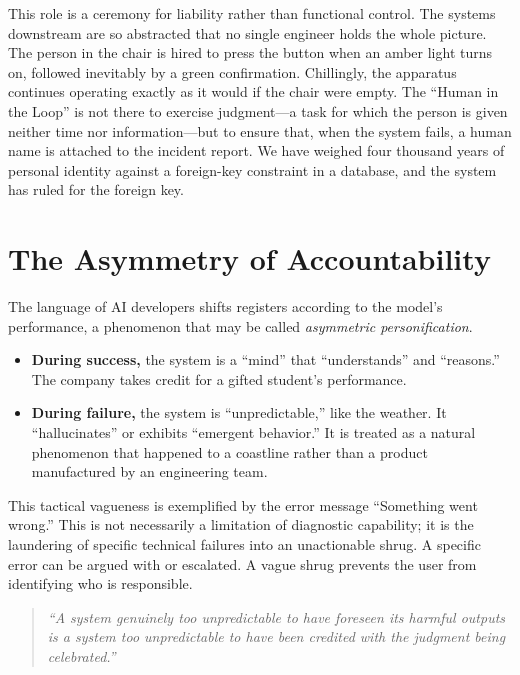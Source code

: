 \documentclass[11pt]{article}
\newenvironment{signalquote}
  {\begin{quote}\itshape\color{accent}}
  {\end{quote}}
\begin{document}
This role is a ceremony for liability rather than functional control. The systems downstream are so abstracted that no single engineer holds the whole picture. The person in the chair is hired to press the button when an amber light turns on, followed inevitably by a green confirmation. Chillingly, the apparatus continues operating exactly as it would if the chair were empty. The \enquote{Human in the Loop} is not there to exercise judgment---a task for which the person is given neither time nor information---but to ensure that, when the system fails, a human name is attached to the incident report. We have weighed four thousand years of personal identity against a foreign-key constraint in a database, and the system has ruled for the foreign key.

\section{The Asymmetry of Accountability}

The language of AI developers shifts registers according to the model's performance, a phenomenon that may be called \emph{asymmetric personification}.

\begin{itemize}
  \item \textbf{During success,} the system is a \enquote{mind} that \enquote{understands} and \enquote{reasons.} The company takes credit for a gifted student's performance.
  \item \textbf{During failure,} the system is \enquote{unpredictable,} like the weather. It \enquote{hallucinates} or exhibits \enquote{emergent behavior.} It is treated as a natural phenomenon that happened to a coastline rather than a product manufactured by an engineering team.
\end{itemize}

This tactical vagueness is exemplified by the error message \enquote{Something went wrong.} This is not necessarily a limitation of diagnostic capability; it is the laundering of specific technical failures into an unactionable shrug. A specific error can be argued with or escalated. A vague shrug prevents the user from identifying who is responsible.

\begin{signalquote}
\enquote{A system genuinely too unpredictable to have foreseen its harmful outputs is a system too unpredictable to have been credited with the judgment being celebrated.}
\end{signalquote}
\end{document}
